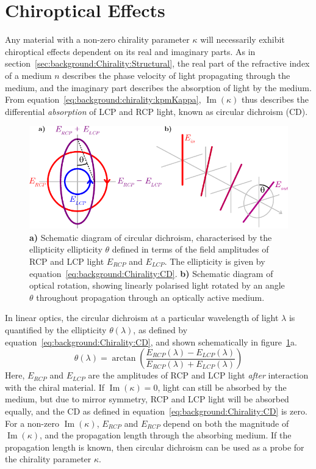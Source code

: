 \section{Chiroptical Effects}\label{sec:background:Chirality:Chiroptics}
Any material with a non-zero chirality parameter $\kappa$ will necessarily exhibit chiroptical effects dependent on its real and imaginary parts. As in section~\ref{sec:background:Chirality:Structural}, the real part of the refractive index of a medium $n$ describes the phase velocity of light propagating through the medium, and the imaginary part describes the absorption of light by the medium. From equation~\ref{eq:background:chirality:kpmKappa}, $\operatorname{Im}(\kappa)$ thus describes the differential \textit{absorption} of LCP and RCP light, known as circular dichroism (CD). 
\begin{figure}[htb!]
    \centering
    \includegraphics[scale=1.0]{./figures/background/chiroptics/cdor.pdf}
    \caption{\label{fig:background:Chirality:cdor}\textbf{a)} Schematic diagram of circular dichroism, characterised by the ellipticity ellipticity $\theta$ defined in terms of the field amplitudes of RCP and LCP light $E_{RCP}$ and $E_{LCP}$. The ellipticity is given by equation~\ref{eq:background:Chirality:CD}. \textbf{b)} Schematic diagram of optical rotation, showing linearly polarised light rotated by an angle $\theta$ throughout propagation through an optically active medium.}
\end{figure}
In linear optics, the circular dichroism at a particular wavelength of light $\lambda$ is quantified by the ellipticity $\theta(\lambda)$, as defined by equation~\ref{eq:background:Chirality:CD}, and shown schematically in figure~\ref{fig:background:Chirality:cdor}a. 
\begin{equation}\label{eq:background:Chirality:CD}
    \theta(\lambda) = \arctan\left( \frac{E_{RCP}(\lambda) - E_{LCP}(\lambda)}{E_{RCP}(\lambda) + E_{LCP}(\lambda)} \right)
\end{equation} 
Here, $E_{RCP}$ and $E_{LCP}$ are the amplitudes of RCP and LCP light \textit{after} interaction with the chiral material. If $\operatorname{Im}(\kappa) = 0$, light can still be absorbed by the medium, but due to mirror symmetry, RCP and LCP light will be absorbed equally, and the CD as defined in equation~\ref{eq:background:Chirality:CD} is zero. For a non-zero $\operatorname{Im}(\kappa)$, $E_{RCP}$ and $E_{RCP}$ depend on both the magnitude of $\operatorname{Im}(\kappa)$, and the propagation length through the absorbing medium. If the propagation length is known, then circular dichroism can be used as a probe for the chirality parameter $\kappa$.

